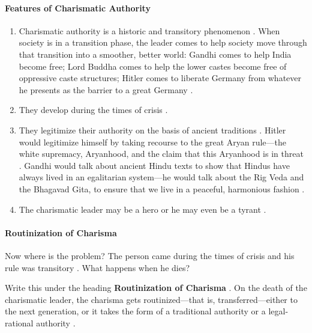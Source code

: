 \paragraph{Features of Charismatic Authority}
\begin{enumerate}
    \item Charismatic authority is a historic and transitory phenomenon . When society is in a transition phase, the leader comes to help society move through that transition into a smoother, better world: Gandhi comes to help India become free; Lord Buddha comes to help the lower castes become free of oppressive caste structures; Hitler comes to liberate Germany from whatever he presents as the barrier to a great Germany .
    \item They develop during the times of crisis .
    \item They legitimize their authority on the basis of ancient traditions . Hitler would legitimize himself by taking recourse to the great Aryan rule---the white supremacy, Aryanhood, and the claim that this Aryanhood is in threat . Gandhi would talk about ancient Hindu texts to show that Hindus have always lived in an egalitarian system---he would talk about the Rig Veda and the Bhagavad Gita, to ensure that we live in a peaceful, harmonious fashion .
    \item The charismatic leader may be a hero or he may even be a tyrant .
\end{enumerate}

\paragraph{Routinization of Charisma}
Now where is the problem? The person came during the times of crisis and his rule was transitory . What happens when he dies? 

\begin{KeyConcept}
Write this under the heading \textbf{Routinization of Charisma} .
On the death of the charismatic leader, the charisma gets routinized---that is, transferred---either to the next generation, or it takes the form of a traditional authority or a legal-rational authority .
\end{KeyConcept}


